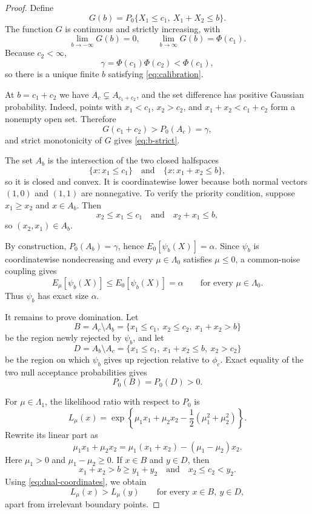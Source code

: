 \documentclass[12pt]{article}
\theoremstyle{definition}
\theoremstyle{remark}
\begin{document}
\begin{proof}
Define
\[
G(b)=P_0\{X_1\le c_1,\ X_1+X_2\le b\}.
\]
The function $G$ is continuous and strictly increasing, with
\[
\lim_{b\to-\infty}G(b)=0,
\qquad
\lim_{b\to\infty}G(b)=\Phi(c_1).
\]
Because $c_2<\infty$,
\[
\gamma=\Phi(c_1)\Phi(c_2)<\Phi(c_1),
\]
so there is a unique finite $b$ satisfying \eqref{eq:calibration}.

At $b=c_1+c_2$ we have $A_c\subsetneq A_{c_1+c_2}$, and the set difference has positive Gaussian probability.  Indeed, points with $x_1<c_1$, $x_2>c_2$, and $x_1+x_2<c_1+c_2$ form a nonempty open set.  Therefore
\[
G(c_1+c_2)>P_0(A_c)=\gamma,
\]
and strict monotonicity of $G$ gives \eqref{eq:b-strict}.

The set $A_b$ is the intersection of the two closed halfspaces
\[
\{x:x_1\le c_1\}
\quad\text{and}\quad
\{x:x_1+x_2\le b\},
\]
so it is closed and convex.  It is coordinatewise lower because both normal vectors $(1,0)$ and $(1,1)$ are nonnegative.  To verify the priority condition, suppose $x_1\ge x_2$ and $x\in A_b$.  Then
\[
x_2\le x_1\le c_1
\quad\text{and}\quad
x_2+x_1\le b,
\]
so $(x_2,x_1)\in A_b$.

By construction, $P_0(A_b)=\gamma$, hence $E_0[\psi_b(X)]=\alpha$.  Since $\psi_b$ is coordinatewise nondecreasing and every $\mu\in\Lambda_0$ satisfies $\mu\le0$, a common-noise coupling gives
\[
E_\mu[\psi_b(X)]\le E_0[\psi_b(X)]=\alpha
\qquad
\text{for every }\mu\in\Lambda_0.
\]
Thus $\psi_b$ has exact size $\alpha$.

It remains to prove domination.  Let
\[
B=A_c\setminus A_b
=\{x_1\le c_1,\ x_2\le c_2,\ x_1+x_2>b\}
\]
be the region newly rejected by $\psi_b$, and let
\[
D=A_b\setminus A_c
=\{x_1\le c_1,\ x_1+x_2\le b,\ x_2>c_2\}
\]
be the region on which $\psi_b$ gives up rejection relative to $\phi_c$.  Exact equality of the two null acceptance probabilities gives
\begin{equation}\label{eq:equal-null-mass}
P_0(B)=P_0(D)>0.
\end{equation}

For $\mu\in\Lambda_1$, the likelihood ratio with respect to $P_0$ is
\[
L_\mu(x)
=
\exp\left\{
\mu_1x_1+\mu_2x_2-\frac12(\mu_1^2+\mu_2^2)
\right\}.
\]
Rewrite its linear part as
\begin{equation}\label{eq:dual-coordinates}
\mu_1x_1+\mu_2x_2
=
\mu_1(x_1+x_2)-(\mu_1-\mu_2)x_2.
\end{equation}
Here $\mu_1>0$ and $\mu_1-\mu_2\ge0$.  If $x\in B$ and $y\in D$, then
\[
x_1+x_2>b\ge y_1+y_2
\quad\text{and}\quad
x_2\le c_2<y_2.
\]
Using \eqref{eq:dual-coordinates}, we obtain
\[
L_\mu(x)>L_\mu(y)
\qquad
\text{for every }x\in B,\ y\in D,
\]
apart from irrelevant boundary points.


\end{proof}
\end{document}
